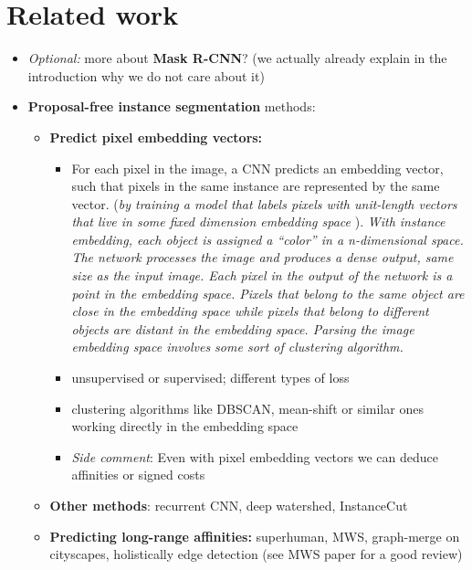 \documentclass[10pt,twocolumn,letterpaper]{article}
\newcommand\TODO[1]{{\color{red}{TODO: #1}}}
\newcommand\SOURCE[1]{{\color{green}{(from: #1)}}}
\begin{document}
\section{Related work}
\begin{itemize}
\item \textit{Optional:} more about \textbf{Mask R-CNN}? (we actually already explain in the introduction why we do not care about it)
\item \textbf{Proposal-free instance segmentation} methods:
\begin{itemize}
\item \textbf{Predict pixel embedding vectors:} 
\begin{itemize}
\item For each pixel in the image, a CNN predicts an embedding vector, such that pixels in the same instance are represented by the same vector. (\textit{by training a model that labels pixels with unit-length vectors that live in some ﬁxed dimension embedding space} \SOURCE{Rec. embeddings} ). \textit{With instance embedding, each object is assigned a “color” in a n-dimensional space. The network processes the image and produces a dense output, same size as the input image. Each pixel in the output of the network is a point in the embedding space. Pixels that belong to the same object are close in the embedding space while pixels that belong to different objects are distant in the embedding space. Parsing the image embedding space involves some sort of clustering algorithm.} \SOURCE{online} 
\item unsupervised or supervised; different types of loss \TODO{Find good summary}
\item clustering algorithms like DBSCAN, mean-shift or similar ones working directly in the embedding space  \TODO{Add refs, discuss with Roman}
\item \textit{Side comment}: Even with pixel embedding vectors we can deduce affinities or signed costs
\end{itemize}
\item \textbf{Other methods}: recurrent CNN, deep watershed, InstanceCut \TODO{Add more, discuss with Roman}
\item \textbf{Predicting long-range affinities:} superhuman, MWS, graph-merge on cityscapes, holistically edge detection (see MWS paper for a good review) \TODO{Add more}
\end{itemize}


\end{itemize}
\end{document}
